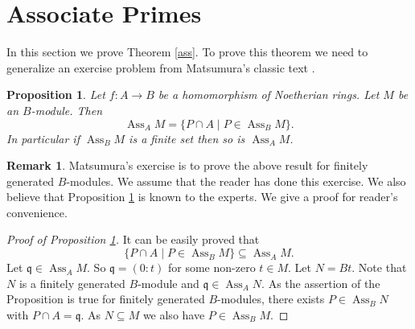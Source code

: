 \documentclass{amsart}
\newcommand{\q}{\mathfrak{q} }
\newcommand{\rt}{\rightarrow}
\newcommand{\Ass}{\operatorname{Ass}}
\theoremstyle{plain}
\newtheorem{proposition}[theorem]{Proposition}
\theoremstyle{definition}
\newtheorem{remark}[theorem]{Remark}
\theoremstyle{remark}
\begin{document}
\section{Associate Primes}
In this section we prove Theorem \ref{ass}.
 To prove this theorem we need to generalize  an exercise problem from 
Matsumura's  classic text \cite[Exercise 6.7]{Mat}.
\begin{proposition}\label{M-ex}
Let $f \colon A \rt B$ be a homomorphism of Noetherian rings. Let $M$ be an $B$-module. Then 
\[
\Ass_A M  = \{ P\cap A \mid P \in \Ass_B M \}.
\]
In particular if $\Ass_B M$ is a finite set then so is $\Ass_A M$.
\end{proposition}
\begin{remark}
Matsumura's exercise is to prove the above result for finitely generated $B$-modules. We assume that the reader has done this exercise.  We also believe that Proposition \ref{M-ex} is known to the experts.  We give a proof for reader's convenience.

\end{remark}
\begin{proof}[Proof of Proposition \ref{M-ex}]
It can be easily proved that
\[
\{ P\cap A \mid P \in \Ass_B M \} \subseteq \Ass_A M.
\]
Let $\q \in \Ass_A M$. So $\q = (0 \colon t)$ for some non-zero $t \in M$. Let $N = Bt$. Note that $N$ is a finitely generated $B$-module and $\q \in \Ass_A N$. As the assertion of the Proposition is true for finitely generated $B$-modules, there exists
$P \in \Ass_B N$ with $P\cap A = \q$. As $N \subseteq M$ we also have $P \in \Ass_B M$. 
\end{proof}
\end{document}
